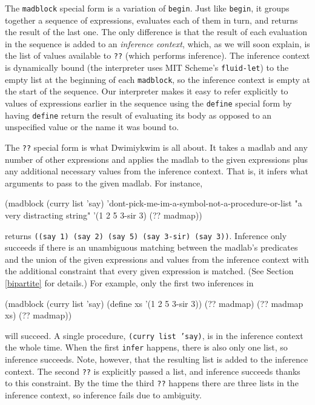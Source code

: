 \documentclass[11pt]{article}
\begin{document}
The \texttt{madblock} special form is a variation of \texttt{begin}.
Just like \texttt{begin},
it groups together a sequence of expressions,
evaluates each of them in turn,
and returns the result of the last one.
The only difference is that the result of each evaluation in the sequence
is added to an \emph{inference context},
which, as we will soon explain,
is the list of values available to \texttt{??}
(which performs inference).
The inference context is dynamically bound
(the interpreter uses MIT Scheme's \texttt{fluid-let})
to the empty list at the beginning of each \texttt{madblock},
so the inference context is empty at the start of the sequence.
Our interpreter makes it easy to refer explicitly
to values of expressions earlier in the sequence
using the \texttt{define} special form
by having \texttt{define} return the result of evaluating its body
as opposed to an unspecified value or the name it was bound to.

The \texttt{??} special form is what Dwimiykwim is all about.
It takes a madlab and any number of other expressions
and applies the madlab to the given expressions
plus any additional necessary values from the inference context.
That is, it infers what arguments to pass to the given madlab.
For instance,
\begin{verbbox}
(madblock
 (curry list 'say)
 'dont-pick-me-im-a-symbol-not-a-procedure-or-list
 "a very distracting string"
 '(1 2 5 3-sir 3)
 (?? madmap))
\end{verbbox}
\begin{quote}\theverbbox\end{quote}
returns \texttt{((say 1) (say 2) (say 5) (say 3-sir) (say 3))}.
Inference only succeeds if there is an unambiguous matching
between the madlab's predicates and the union of the given expressions
and values from the inference context
with the additional constraint that every given expression is matched.
(See Section \ref{bipartite} for details.)
For example, only the first two inferences in
\begin{verbbox}
(madblock
 (curry list 'say)
 (define xs '(1 2 5 3-sir 3))
 (?? madmap)
 (?? madmap xs)
 (?? madmap))
\end{verbbox}
\begin{quote}\theverbbox\end{quote}
will succeed.
A single procedure, \texttt{(curry list 'say)},
is in the inference context the whole time.
When the first \texttt{infer} happens,
there is also only one list, so inference succeeds.
Note, however, that the resulting list is added to the inference context.
The second \texttt{??} is explicitly passed a list,
and inference succeeds thanks to this constraint.
By the time the third \texttt{??} happens
there are three lists in the inference context,
so inference fails due to ambiguity.
\end{document}
